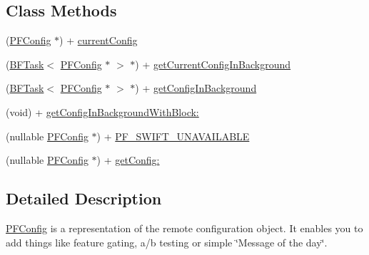 \subsection*{Class Methods}
\begin{DoxyCompactItemize}
\item 
(\hyperlink{interface_p_f_config}{P\+F\+Config} $\ast$) + \hyperlink{interface_p_f_config_ab9e3da933693acf660de9b8a47ad2458}{current\+Config}
\begin{DoxyCompactList}\small\item\em 

 \end{DoxyCompactList}\item 
(\hyperlink{class_b_f_task}{B\+F\+Task}$<$ \hyperlink{interface_p_f_config}{P\+F\+Config} $\ast$ $>$ $\ast$) + \hyperlink{interface_p_f_config_aecb109218f987bcdcd03ec377ea93dcb}{get\+Current\+Config\+In\+Background}
\item 
(\hyperlink{class_b_f_task}{B\+F\+Task}$<$ \hyperlink{interface_p_f_config}{P\+F\+Config} $\ast$ $>$ $\ast$) + \hyperlink{interface_p_f_config_a7cc2dd258dc9af6ae2ed3e1739247580}{get\+Config\+In\+Background}
\begin{DoxyCompactList}\small\item\em 

 \end{DoxyCompactList}\item 
(void) + \hyperlink{interface_p_f_config_a59863da001385117f37c1b6aefb908f6}{get\+Config\+In\+Background\+With\+Block\+:}
\item 
(nullable \hyperlink{interface_p_f_config}{P\+F\+Config} $\ast$) + \hyperlink{interface_p_f_config_a5428cf4c7686dd9c214a6fee6dcf28f6}{P\+F\+\_\+\+S\+W\+I\+F\+T\+\_\+\+U\+N\+A\+V\+A\+I\+L\+A\+B\+L\+E}
\begin{DoxyCompactList}\small\item\em 

 \end{DoxyCompactList}\item 
(nullable \hyperlink{interface_p_f_config}{P\+F\+Config} $\ast$) + \hyperlink{interface_p_f_config_a90f9c38de2621c7d624326f14b5ec558}{get\+Config\+:}
\end{DoxyCompactItemize}


\subsection{Detailed Description}
{\ttfamily \hyperlink{interface_p_f_config}{P\+F\+Config}} is a representation of the remote configuration object. It enables you to add things like feature gating, a/b testing or simple \char`\"{}\+Message of the day\char`\"{}. 

